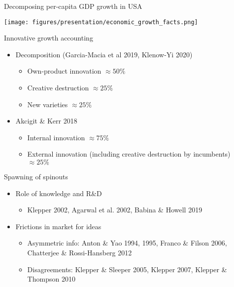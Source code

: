 \documentclass[english,usenames,dvipsnames]{beamer}
\begin{document}
\begin{frame}{Decomposing per-capita GDP growth in USA}\label{economic_growth_facts}\hyperlink{motivation_1}{}
	\begin{table}
		\texttt{[image: figures/presentation/economic\_growth\_facts.png]}
		\caption{Growth accounting (from Jones 2016, "The Facts of Economic Growth")}
	\end{table}
\end{frame}

\begin{frame}{Innovative growth accounting}\label{motivation:importanceofOI}
	\hyperlink{motivation_1}{}
	\begin{itemize}
		\medskip
		\item Decomposition (Garcia-Macia et al 2019, Klenow-Yi 2020)
		\begin{itemize}
			\item Own-product innovation $\approx 50\%$
			\item Creative destruction $\approx 25\%$
			\item New varieties $\approx 25\%$
		\end{itemize}
		\item Akcigit \& Kerr 2018
		\begin{itemize}
			\item Internal innovation $\approx 75\%$
			\item External innovation (including creative destruction by incumbents) $\approx 25\%$
		\end{itemize}
	\end{itemize}
\end{frame}


\begin{frame}{Spawning of spinouts}
	\label{motivation:spawningOfSpinouts}
	\hyperlink{motivation_1}{}
	\begin{itemize}
		\item Role of knowledge and R\&D
		\begin{itemize}
			\item Klepper 2002, Agarwal et al. 2002, Babina \& Howell 2019
		\end{itemize}
		\item Frictions in market for ideas
		\begin{itemize}
			\item Asymmetric info: Anton \& Yao 1994, 1995, Franco \& Filson 2006, Chatterjee \& Rossi-Hansberg 2012
			\item Disagreements: Klepper \& Sleeper 2005, Klepper 2007, Klepper \& Thompson 2010
		\end{itemize}
	\end{itemize}
\end{frame}
\end{document}
